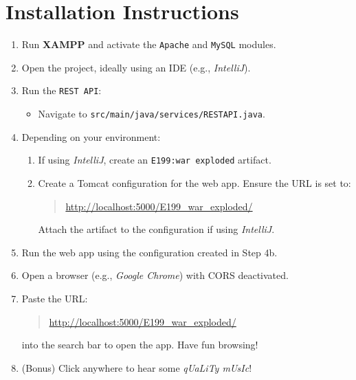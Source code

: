 \documentclass[12pt]{article}
\begin{document}
\section*{Installation Instructions}

\begin{enumerate}[label=\arabic*.]
    \item Run \textbf{XAMPP} and activate the \texttt{Apache} and \texttt{MySQL} modules.
    \item Open the project, ideally using an IDE (e.g., \textit{IntelliJ}).
    \item Run the \texttt{REST API}:
    \begin{itemize}
        \item Navigate to \texttt{src/main/java/services/RESTAPI.java}.
    \end{itemize}
    \item Depending on your environment:
    \begin{enumerate}[label=\alph*.]
        \item If using \textit{IntelliJ}, create an \texttt{E199:war exploded} artifact.
        \item Create a Tomcat configuration for the web app. Ensure the URL is set to:
        \begin{quote}
            \url{http://localhost:5000/E199_war_exploded/}
        \end{quote}
        Attach the artifact to the configuration if using \textit{IntelliJ}.
    \end{enumerate}
    \item Run the web app using the configuration created in Step 4b.
    \item Open a browser (e.g., \textit{Google Chrome}) with CORS deactivated.
    \item Paste the URL:
    \begin{quote}
        \url{http://localhost:5000/E199_war_exploded/}
    \end{quote}
    into the search bar to open the app. Have fun browsing!
    \item (Bonus) Click anywhere to hear some \textit{qUaLiTy mUsIc}!
\end{enumerate}
\end{document}
